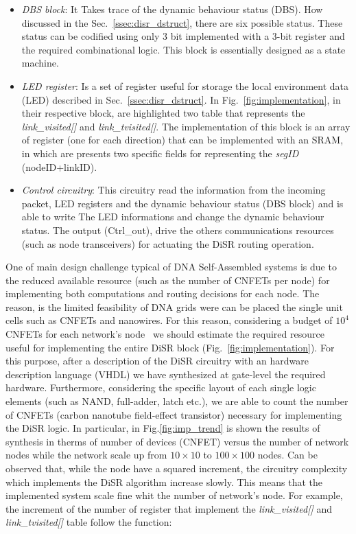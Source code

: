 \begin{itemize}
\item \emph{DBS block}: It Takes trace of the dynamic behaviour status (DBS). 
      How discussed in the Sec.~\ref{ssec:disr_dstruct}, there are six possible status. 
      These status can be codified using only 3 bit implemented with a 3-bit register 
      and the required combinational logic. This block is essentially designed as a state machine.
\item \emph{LED register}: Is a set of register useful for storage the local environment data (LED)
      described in Sec.~\ref{ssec:disr_dstruct}. In Fig.~\ref{fig:implementation}, in their 
      respective block, are highlighted two table that represents the \emph{link\_visited[]} 
      and \emph{link\_tvisited[]}. The implementation of this block is an array of register 
      (one for each direction) that can be implemented with an SRAM, in which are presents two 
      specific fields  for representing the \emph{segID} (nodeID+linkID). 
\item \emph{Control circuitry}: This circuitry read the information from the incoming packet, 
      LED registers and the dynamic behaviour status (DBS block) and is able to write The LED
      informations and change the dynamic behaviour status. The output (Ctrl\_out), drive 
      the others communications resources (such as node transceivers) for actuating the DiSR 
      routing operation.
\end{itemize}

One of main design challenge typical of DNA Self-Assembled systems is due to the
reduced available resource (such as the number of CNFETs per node) for implementing both 
computations and routing decisions for each node. The reason, is the limited feasibility
of DNA grids were can be placed the single unit cells such as CNFETs and nanowires.
For this reason, considering a budget of $10^4$ CNFETs for each network's node~\cite{liu_jetcs}
we should estimate the required resource useful for implementing the entire DiSR block 
(Fig.~\ref{fig:implementation}). For this purpose, after a description of the DiSR circuitry 
with an hardware description language (VHDL) we have synthesized at gate-level the required 
hardware. Furthermore, considering the specific layout of each single logic elements 
(such as NAND, full-adder, latch etc.), we are able to count the number of CNFETs 
(carbon nanotube field-effect transistor) necessary for implementing the DiSR logic. 
In particular, in Fig.\ref{fig:imp_trend} is shown the results of synthesis in therms 
of number of devices (CNFET) versus the number of network nodes while the network scale 
up from $10\times10$ to $100\times100$ nodes. Can be observed that, while the node have
a squared increment, the circuitry complexity which implements the DiSR algorithm increase slowly. 
This means that the implemented system scale fine whit the number of network's node. 
For example, the increment of the number of register that implement the \emph{link\_visited[]} 
and \emph{link\_tvisited[]} table follow the function:

